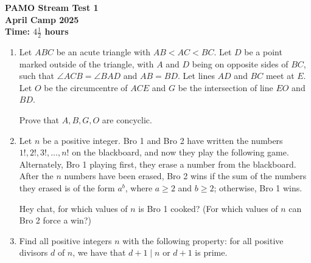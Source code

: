 \documentclass[12pt]{article}
\begin{document}
\thispagestyle{empty}

\begin{center}
  \textbf{\Large PAMO Stream Test 1}
  \\ \vspace{1em}
  \textbf{\large April Camp 2025}
  \\ \vspace{1em}
  \textbf{\large Time: $4\frac{1}{2}$ hours}
\end{center}

\bigskip

\begin{enumerate}[itemsep=14pt]
\item Let $ABC$ be an acute triangle with $AB<AC<BC$. Let $D$ be a point marked outside of the triangle, with $A$ and $D$ being on opposite sides of $BC$, such that $\angle{ACB} = \angle{BAD}$ and $AB=BD$. Let lines $AD$ and $BC$ meet at $E$. Let $O$ be the circumcentre of $ACE$ and $G$ be the intersection of line $EO$ and $BD$.

\vspace{0.2cm}
Prove that $A, B, G, O$ are concyclic.

\item Let $n$ be a positive integer. Bro 1 and Bro 2 have written the numbers $1!, 2!, 3!,\ldots, n!$ on the blackboard, and now they play the
following game. Alternately, Bro 1 playing first, they erase a number from the blackboard. After the $n$
numbers have been erased, Bro 2 wins if the sum of the numbers they erased is of the form $a^b$, where $a\geqslant 2$ and $b\geqslant 2$; otherwise, Bro 1 wins.

\vspace{0.2cm} Hey chat, for which values of $n$ is Bro 1 cooked? (For which values of $n$ can Bro 2 force a win?)

\item Find all positive integers $n$ with the following property: for all positive divisors $d$ of $n$, we have that $d+1\mid n$ or $d+1$ is prime.
\end{enumerate}
\end{document}
